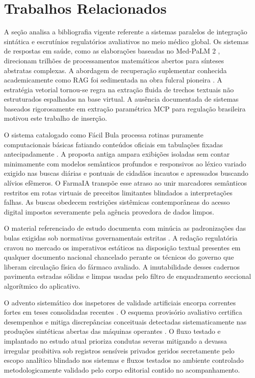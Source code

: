 \documentclass[12pt]{article}
\begin{document}
\section{Trabalhos Relacionados}
\label{sec:relacionados}

A seção analisa a bibliografia vigente referente a sistemas paralelos de integração sintática e escrutínios regulatórios avaliativos no meio médico global. Os sistemas de respostas em saúde, como as elaborações baseadas no Med-PaLM 2 \cite{singhal2023medpalm2}, direcionam trilhões de processamentos matemáticos abertos para sínteses abstratas complexas. A abordagem de recuperação suplementar conhecida academicamente como RAG foi sedimentada na obra fulcral pioneira \cite{lewis2020rag}. A estratégia vetorial tornou-se regra na extração fluida de trechos textuais não estruturados espalhados na base virtual. A ausência documentada de sistemas baseados rigorosamente em extração paramétrica MCP para regulação brasileira motivou este trabalho de inserção.

O sistema catalogado como Fácil Bula processa rotinas puramente computacionais básicas fatiando conteúdos oficiais em tabulações fixadas antecipadamente \cite{ferrari2016facilbula}. A proposta antiga ampara exibições isoladas sem contar minimamente com modelos semânticos profundos e responsivos ao léxico variado exigido nas buscas diárias e pontuais de cidadãos incautos e apressados buscando alívios efêmeros. O FarmaIA transpõe esse atraso ao unir marcadores semânticos restritos em rotas virtuais de preceitos limitantes blindados a interpretações falhas. As buscas obedecem restrições sistêmicas contemporâneas do acesso digital impostos severamente pela agência provedora de dados limpos.

O material referenciado de estudo documenta com minúcia as padronizações das bulas exigidas sob normativas governamentais estritas \cite{pinto2013bulas}. A redação regulatória cravou no mercado os imperativos estáticos na disposição textual presentes em qualquer documento nacional chancelado perante os técnicos do governo que liberam circulação física do fármaco avaliado. A imutabilidade desses cadernos pavimenta estradas sólidas e limpas usadas pelo filtro de enquadramento seccional algorítmico do aplicativo.

O advento sistemático dos inspetores de validade artificiais encorpa correntes fortes em teses consolidadas recentes \cite{zhuge2025agentjudge}. O esquema provisório avaliativo certifica desempenhos e mitiga discrepâncias conceituais detectadas sistematicamente nas produções sintéticas abertas das máquinas operantes \cite{xu2026surveyagentjudge}. O fluxo testado e implantado no estudo atual prioriza condutas severas mitigando a devassa irregular proibitiva sob registros sensíveis privados geridos secretamente pelo escopo analítico blindado nos sistemas e fluxos testados no ambiente controlado metodologicamente validado pelo corpo editorial contido no acompanhamento.
\end{document}
